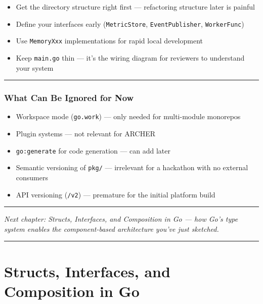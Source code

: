\documentclass[11pt,openany]{book}
\providecommand{\tightlist}{%
  \setlength{\itemsep}{0pt}\setlength{\parskip}{0pt}}
\begin{document}
\begin{itemize}
\tightlist
\item
  Get the directory structure right first --- refactoring structure
  later is painful
\item
  Define your interfaces early (\texttt{MetricStore},
  \texttt{EventPublisher}, \texttt{WorkerFunc})
\item
  Use \texttt{MemoryXxx} implementations for rapid local development
\item
  Keep \texttt{main.go} thin --- it's the wiring diagram for reviewers
  to understand your system
\end{itemize}

\begin{center}\rule{0.5\linewidth}{0.5pt}\end{center}

\hypertarget{what-can-be-ignored-for-now-1}{%
\subsection{What Can Be Ignored for
Now}\label{what-can-be-ignored-for-now-1}}

\begin{itemize}
\tightlist
\item
  Workspace mode (\texttt{go.work}) --- only needed for multi-module
  monorepos
\item
  Plugin systems --- not relevant for ARCHER
\item
  \texttt{go:generate} for code generation --- can add later
\item
  Semantic versioning of \texttt{pkg/} --- irrelevant for a hackathon
  with no external consumers
\item
  API versioning (\texttt{/v2}) --- premature for the initial platform
  build
\end{itemize}

\begin{center}\rule{0.5\linewidth}{0.5pt}\end{center}

\emph{Next chapter: Structs, Interfaces, and Composition in Go --- how
Go's type system enables the component-based architecture you've just
sketched.}

\begin{center}\rule{0.5\linewidth}{0.5pt}\end{center}

\hypertarget{chapter-03-structs-interfaces-and-composition-in-go}{%
\chapter{Structs, Interfaces, and Composition in
Go}\label{chapter-03-structs-interfaces-and-composition-in-go}}
\end{document}
